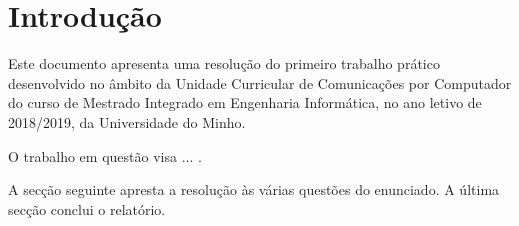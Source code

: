 
\section*{Introdução}

Este documento apresenta uma resolução do primeiro trabalho prático desenvolvido
no âmbito da Unidade Curricular de Comunicações por Computador do curso de
Mestrado Integrado em Engenharia Informática, no ano letivo de 2018/2019, da
Universidade do Minho.

O trabalho em questão visa ... .

A secção seguinte apresta a resolução às várias questões do enunciado. A última
secção conclui o relatório.

